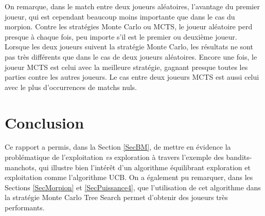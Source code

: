 \documentclass[a4paper,11pt]{article}
\begin{document}
On remarque, dans le match entre deux joueurs aléatoires, l'avantage du premier joueur, qui est cependant beaucoup moins importante que dans le cas du morpion. Contre les stratégies Monte Carlo ou MCTS, le joueur aléatoire perd presque à chaque fois, peu importe s'il est le premier ou deuxième joueur. Lorsque les deux joueurs suivent la stratégie Monte Carlo, les résultats ne sont pas très différents que dans le cas de deux joueurs aléatoires. Encore une fois, le joueur MCTS est celui avec la meilleure stratégie, gagnant presque toutes les parties contre les autres joueurs. Le cas entre deux joueurs MCTS est aussi celui avec le plus d'occurrences de matchs nuls.


\section{Conclusion}

Ce rapport a permis, dans la Section \ref{SecBM}, de mettre en évidence la problématique de l'exploitation \emph{vs} exploration à travers l'exemple des bandits-manchots, qui illustre bien l'intérêt d'un algorithme équilibrant exploration et exploitation comme l'algorithme UCB. On a également pu remarquer, dans les Sections \ref{SecMorpion} et \ref{SecPuissance4}, que l'utilisation de cet algorithme dans la stratégie Monte Carlo Tree Search permet d'obtenir des joueurs très performants.
\end{document}
